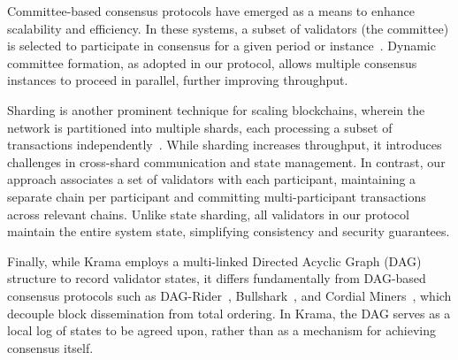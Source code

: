 Committee-based consensus protocols have emerged as a means to enhance scalability and efficiency. In these systems, a subset of validators (the committee) is selected to participate in consensus for a given period or instance~\cite{ZMR18, GHMVZ17, PS17}. Dynamic committee formation, as adopted in our protocol, allows multiple consensus instances to proceed in parallel, further improving throughput.

Sharding is another prominent technique for scaling blockchains, wherein the network is partitioned into multiple shards, each processing a subset of transactions independently~\cite{KJ+17, SPW19, Zil17, Har}. While sharding increases throughput, it introduces challenges in cross-shard communication and state management. In contrast, our approach associates a set of validators with each participant, maintaining a separate chain per participant and committing multi-participant transactions across relevant chains. Unlike state sharding, all validators in our protocol maintain the entire system state, simplifying consistency and security guarantees.

Finally, while Krama employs a multi-linked Directed Acyclic Graph (DAG) structure to record validator states, it differs fundamentally from DAG-based consensus protocols such as DAG-Rider~\cite{KKNS21}, Bullshark~\cite{SGSK22}, and Cordial Miners~\cite{KNPS22}, which decouple block dissemination from total ordering. In Krama, the DAG serves as a local log of states to be agreed upon, rather than as a mechanism for achieving consensus itself.



